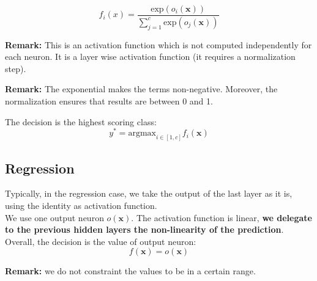 \begin{equation}
	f_{i}(x) = \frac{\text{exp}(o_{i}(\pmb{x}))}{\sum_{j=1}^{c}\text{exp}(o_{j}(\pmb{x}))}
\end{equation}

\textbf{Remark:} This is an activation function which is not computed independently
for each neuron. It is a layer wise activation function (it requires a normalization
step).
\newline

\textbf{Remark:} The exponential makes the terms non-negative. Moreover, the normalization
ensures that results are between 0 and 1.
\newline

The decision is the highest scoring class:
\begin{equation}
	y^{*}= \text{argmax}_{i \in [1,c]}f_{i}(\pmb{x})
\end{equation}

\subsection{Regression}
Typically, in the regression case, we take the output of the last layer as it is,
using the identity as activation function. \\ We use one output neuron
$o(\pmb{x})$. The activation function is linear, \textbf{we delegate to the
previous hidden layers the non-linearity of the prediction}. Overall, the decision
is the value of output neuron:
\begin{equation}
	f(\pmb{x}) = o(\pmb{x})
\end{equation}

\textbf{Remark:} we do not constraint the values to be in a certain range.

